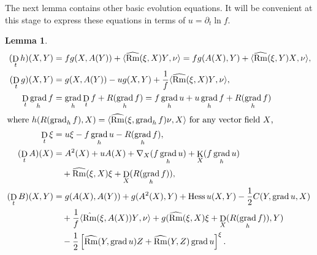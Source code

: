 \documentclass{amsart}
\newtheorem{lemma}[theorem]{Lemma}
\theoremstyle{definition}
\theoremstyle{remark}
\newcommand{\ip}[2]{\ensuremath{\langle{#1},{#2}\rangle}}
\DeclareMathOperator{\grad}{grad}
\DeclareMathOperator{\Rm}{Rm}
\DeclareMathOperator{\hess}{Hess}
\DeclareMathOperator{\diff}{K}
\DeclareMathOperator{\D}{D}
\numberwithin{equation}{section}
\begin{document}
The next lemma contains other basic evolution equations. It will be convenient at this stage to express these equations in terms of $u = \partial_t \ln f$.
\begin{lemma}
\begin{align*}
(\D_t h) (X, Y) &= f g(X, A(Y)) + \ip{\widehat{\Rm}(\xi, X) Y}{\nu} =  f g(A(X), Y) + \ip{\widehat{\Rm}(\xi, Y) X}{\nu}, \\
(\D_t g) (X, Y) &= g(X, A(Y)) - u g(X, Y) + \frac{1}{f} \ip{\widehat{\Rm}(\xi, X) Y}{\nu}, \\
\D_t \grad_h f &= \grad_h \D_t f + R(\grad_h f) = f \grad_h u + u \grad_h f + R(\grad_h f) \\
\intertext{where $h(R({\grad_h f}), X) = \ip{\widehat{\Rm}(\xi, \grad_h f) \nu}{X}$ for any vector field $X$,}
\D_t \xi &= u\xi - f\grad_h u - R(\grad_h f), \\
(\D_t A)(X) &= A^2(X) + u A(X) + \nabla_X (f\grad_h u) + \diff_X (f\grad_h u) \\
&\quad + \widehat{\Rm} (\xi, X) \xi + \D_X (R(\grad_h f)), \\
(\D_t B) (X, Y) &= g(A(X), A(Y)) + g(A^2(X), Y) + \hess u (X, Y) -\frac{1}{2} C(Y, \grad u, X) \\
&\quad +\frac{1}{f} \ip{\hat{\Rm} (\xi, A(X))Y}{\nu} + g(\widehat{\Rm}(\xi, X)\xi  + \D_X (R(\grad_h f)), Y) \\
&\quad -\frac{1}{2} \left[\widehat{\Rm} (Y, \grad u)Z +  \widehat{\Rm} (Y, Z) \grad u\right]^{\xi}.
\end{align*}
\end{lemma}
\end{document}
